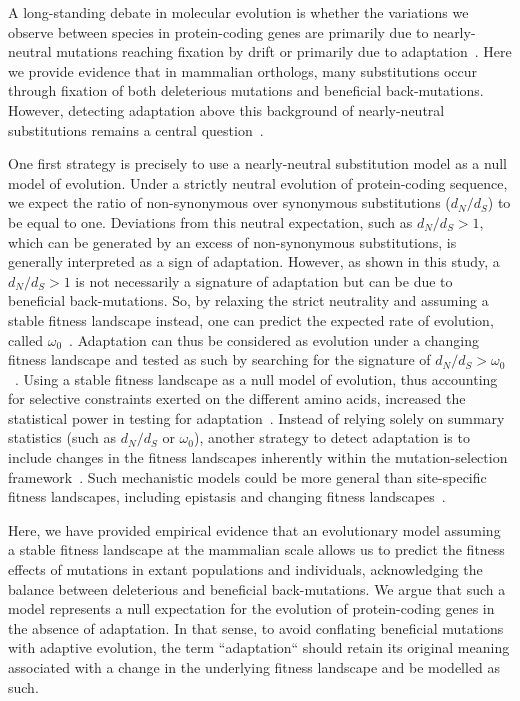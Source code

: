 \documentclass{article}
\newcommand{\dn}{d_N}
\newcommand{\ds}{d_S}
\newcommand{\dnds}{\dn / \ds}
\begin{document}
    A long-standing debate in molecular evolution is whether the variations we observe between species in protein-coding genes are primarily due to nearly-neutral mutations reaching fixation by drift or primarily due to adaptation~\cite{kimura_evolutionary_1968,jensen_importance_2019,gillespie_substitution_1994,Ohta1992}.
    Here we provide evidence that in mammalian orthologs, many substitutions occur through fixation of both deleterious mutations and beneficial back-mutations.
    However, detecting adaptation above this background of nearly-neutral substitutions remains a central question~\cite{kimura_evolutionary_1968,ohta_development_1996}.

    One first strategy is precisely to use a nearly-neutral substitution model as a null model of evolution.
    Under a strictly neutral evolution of protein-coding sequence, we expect the ratio of non-synonymous over synonymous substitutions ($\dnds$) to be equal to one.
    Deviations from this neutral expectation, such as $\dnds > 1$, which can be generated by an excess of non-synonymous substitutions, is generally interpreted as a sign of adaptation.
    However, as shown in this study, a $\dnds > 1$ is not necessarily a signature of adaptation but can be due to beneficial back-mutations.
    So, by relaxing the strict neutrality and assuming a stable fitness landscape instead, one can predict the expected rate of evolution, called $\omega_0$~\cite{spielman_relationship_2015, dosreis_how_2015}.
    Adaptation can thus be considered as evolution under a changing fitness landscape and tested as such by searching for the signature of $\dnds > \omega_0$~\cite{cvijovic_fate_2015, rodrigue_detecting_2017, rodrigue_bayesian_2021}.
    Using a stable fitness landscape as a null model of evolution, thus accounting for selective constraints exerted on the different amino acids, increased the statistical power in testing for adaptation~\cite{latrille_genes_2023}.
    Instead of relying solely on summary statistics (such as $\dnds$ or $\omega_0$), another strategy to detect adaptation is to include changes in the fitness landscapes inherently within the mutation-selection framework~\cite{tamuri_mutationselection_2021}.
    Such mechanistic models could be more general than site-specific fitness landscapes, including epistasis and changing fitness landscapes~\cite{goldstein_sequence_2017, stolyarova_senescence_2020}.

    Here, we have provided empirical evidence that an evolutionary model assuming a stable fitness landscape at the mammalian scale allows us to predict the fitness effects of mutations in extant populations and individuals, acknowledging the balance between deleterious and beneficial back-mutations.
    We argue that such a model represents a null expectation for the evolution of protein-coding genes in the absence of adaptation.
    In that sense, to avoid conflating beneficial mutations with adaptive evolution, the term ``adaptation`` should retain its original meaning associated with a change in the underlying fitness landscape and be modelled as such.
\end{document}
